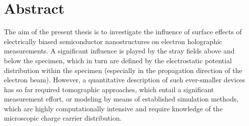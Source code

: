\chapter*{Abstract}
The aim of the present thesis is to investigate the influence of surface effects of electrically biased semiconductor nanostructures on electron holographic measurements. A significant influence is played by the stray fields above and below the specimen, which in turn are defined by the electrostatic potential distribution within the specimen (especially in the propagation direction of the electron beam). However, a quantitative description of such ever-smaller devices has so far required tomographic approaches, which entail a significant measurement effort, or modeling by means of established simulation methods, which are highly computationally intensive and require knowledge of the microscopic charge carrier distribution.

